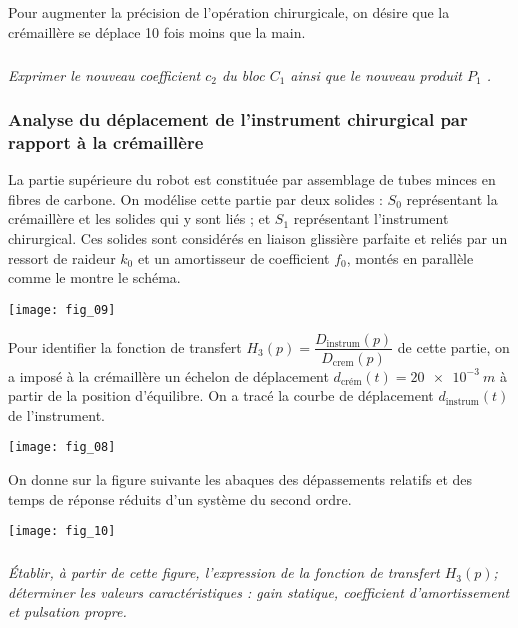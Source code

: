 \begin{multicols}{2}
Pour augmenter la précision de l’opération chirurgicale, on désire que la crémaillère se déplace 10 fois moins que la main. 




\subparagraph{}\textit{Exprimer le nouveau coefficient $c_2$ du bloc $C_1$ ainsi que le nouveau produit  $P_1$ . }
\ifprof
\begin{corrige}
\end{corrige}
\else
\fi

\subsubsection*{Analyse du déplacement de l’instrument chirurgical par rapport à la crémaillère}

La partie supérieure du robot est constituée par assemblage de tubes minces en fibres de carbone. 
On modélise cette partie par deux solides : $S_0$ représentant la crémaillère et les solides qui y sont liés ;  et $S_1$ représentant l’instrument chirurgical. 
Ces solides sont considérés en liaison glissière parfaite et reliés par un ressort de raideur $k_0$ et un amortisseur de coefficient $f_0$, montés en parallèle comme le montre le schéma.

\begin{center}
\texttt{[image: fig\_09]}
\end{center}

Pour identifier la fonction de transfert $H_3(p)=\dfrac{D_{\text{instrum}}(p)}{D_{\text{crem}}(p)}$ de cette partie, on a imposé à la crémaillère un échelon de déplacement $d_{\text{crém}}(t) = \SI{20e-3}{m}$ à partir de la position d’équilibre. On a tracé la courbe de déplacement $d_{\text{instrum}}(t)$ de l’instrument.

\begin{center}
\texttt{[image: fig\_08]}
\end{center}

On donne sur la figure suivante les abaques des dépassements relatifs et des temps de réponse réduits d’un système du second ordre.

\begin{center}
\texttt{[image: fig\_10]}
\end{center}


\subparagraph{}\textit{Établir, à partir de cette figure, l’expression de la fonction de transfert $H_3(p)$; déterminer les valeurs caractéristiques : gain statique, coefficient d’amortissement et pulsation propre.}
\ifprof
\begin{corrige}
\end{corrige}
\else
\fi



\end{multicols}
